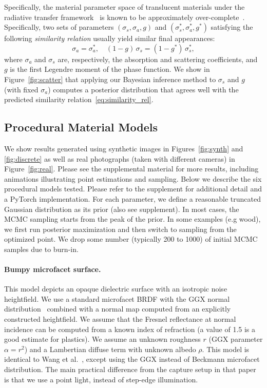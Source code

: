 Specifically, the material parameter space of translucent materials under the radiative transfer framework~\cite{chandrasekhar1960radiative} is known to be approximately over-complete~\cite{Zhao:2014:HSR}.
Specifically, two sets of parameters $(\sigma_s, \sigma_a, g)$ and $(\sigma_s^*, \sigma_a^*, g^*)$ satisfying the following \emph{similarity relation} usually yield similar final appearances:
%
\begin{equation}
	\label{eq:similarity_rel}
	\sigma_a = \sigma_a^*, \quad (1 - g)\,\sigma_s = (1 - g^*)\,\sigma_s^*,
\end{equation}
%
where $\sigma_a$ and $\sigma_s$ are, respectively, the absorption and scattering coefficients, and $g$ is the first Legendre moment of the phase function.
We show in Figure~\ref{fig:scatter} that applying our Bayesian inference method to $\sigma_s$ and $g$ (with fixed $\sigma_a$) computes a posterior distribution that agrees well with the predicted similarity relation~\eqref{eq:similarity_rel}.





\subsection{Procedural Material Models}
\label{ssec:proc_models}
%
We show results generated using synthetic images in Figures~\ref{fig:synth} and \ref{fig:discrete} as well as real photographs (taken with different cameras) in Figure~\ref{fig:real}.
Please see the supplemental material for more results, including animations illustrating point estimations and sampling. Below we describe the six procedural models tested. Please refer to the supplement for additional detail and a \textsf{PyTorch} implementation. For each parameter, we define a reasonable truncated Gaussian distribution as its prior (also see supplement). In most cases, the MCMC sampling starts from the peak of the prior. In some examples (e.g wood), we first run posterior maximization and then switch to sampling from the optimized point. We drop some number (typically 200 to 1000) of initial MCMC samples due to burn-in.

\paragraph*{Bumpy microfacet surface.}
This model depicts an opaque dielectric surface with an isotropic noise heightfield. We use a standard microfacet BRDF with the GGX normal distribution~\cite{Walter2007} combined with a normal map computed from an explicitly constructed heightfield. We assume that the Fresnel reflectance at normal incidence can be computed from a known index of refraction (a value of 1.5 is a good estimate for plastics). We assume an unknown roughness $r$ (GGX parameter $\alpha=r^2$) and a Lambertian diffuse term with unknown albedo $\rho$. This model is identical to Wang et al.~\cite{Wang2011}, except using the GGX instead of Beckmann microfacet distribution. The main practical difference from the capture setup in that paper is that we use a point light, instead of step-edge illumination.

